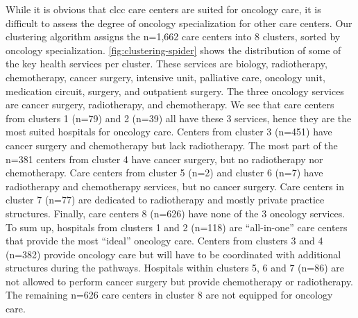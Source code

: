 While it is obvious that \ac{clcc} care centers are suited for oncology care, it
is difficult to assess the degree of oncology specialization for other care
centers. Our clustering algorithm assigns the n=1,662 care centers into 8
clusters, sorted by oncology specialization. \cref{fig:clustering-spider} shows
the distribution of some of the key health services per cluster. These services
are biology, radiotherapy, chemotherapy, cancer surgery, intensive unit,
palliative care, oncology unit, medication circuit, surgery, and outpatient
surgery. The three oncology services are cancer surgery, radiotherapy, and
chemotherapy. We see that care centers from clusters 1 (n=79) and 2 (n=39) all
have these 3 services, hence they are the most suited hospitals for oncology
care. Centers from cluster 3 (n=451) have cancer surgery and chemotherapy but
lack radiotherapy. The most part of the n=381 centers from cluster 4 have cancer
surgery, but no radiotherapy nor chemotherapy. Care centers from cluster 5 (n=2)
and cluster 6 (n=7) have radiotherapy and chemotherapy services, but no cancer
surgery. Care centers in cluster 7 (n=77) are dedicated to radiotherapy and
mostly private practice structures. Finally, care centers 8 (n=626) have none of
the 3 oncology services. To sum up, hospitals from clusters 1 and 2 (n=118) are
“all-in-one” care centers that provide the most “ideal” oncology care. Centers
from clusters 3 and 4 (n=382) provide oncology care but will have to be
coordinated with additional structures during the pathways. Hospitals within
clusters 5, 6 and 7 (n=86) are not allowed to perform cancer surgery but provide
chemotherapy or radiotherapy. The remaining n=626 care centers in cluster 8 are
not equipped for oncology care.

